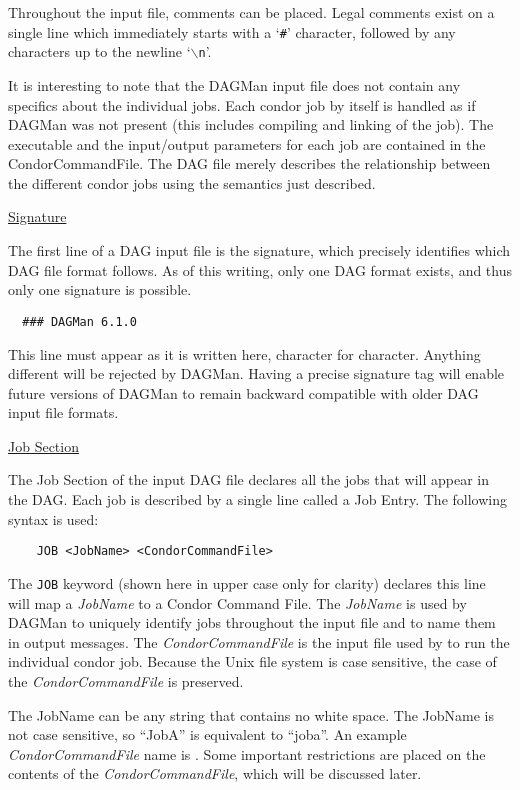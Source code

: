 Throughout the input file, comments can be placed.  Legal comments exist on a
single line which immediately starts with a `\texttt{\#}' character, followed
by any characters up to the newline `\texttt{$\backslash$n}'.

It is interesting to note that the DAGMan input file does not contain any
specifics about the individual jobs. Each condor job by itself is handled as
if DAGMan was not present (this includes compiling and linking of the
job). The executable and the input/output parameters for each job are
contained in the CondorCommandFile.  The DAG file merely describes the
relationship between the different condor jobs using the semantics just
described.

\underline{Signature}

The first line of a DAG input file is the signature, which precisely
identifies which DAG file format follows.  As of this writing, only one DAG
format exists, and thus only one signature is possible.

\begin{verbatim}
  ### DAGMan 6.1.0
\end{verbatim}

This line must appear as it is written here, character for character.
Anything different will be rejected by DAGMan.  Having a precise signature tag
will enable future versions of DAGMan to remain backward compatible with older
DAG input file formats.

\underline{Job Section}

The Job Section of the input DAG file declares all the jobs that will appear
in the DAG.  Each job is described by a single line called a Job Entry.  The
following syntax is used:

\begin{verbatim}
	JOB <JobName> <CondorCommandFile>
\end{verbatim}

The \texttt{JOB} keyword (shown here in upper case only for clarity) declares
this line will map a \textit{JobName} to a Condor Command File.  The
\textit{JobName} is used by DAGMan to uniquely identify jobs throughout the
input file and to name them in output messages.  The
\textit{CondorCommandFile} is the input file used by  to run
the individual condor job.  Because the Unix file system is case sensitive,
the case of the \textit{CondorCommandFile} is preserved.

The JobName can be any string that contains no white space.  The JobName is
not case sensitive, so ``JobA'' is equivalent to ``joba''.  An example
\textit{CondorCommandFile} name is .  Some important
restrictions are placed on the contents of the \textit{CondorCommandFile},
which will be discussed later.

